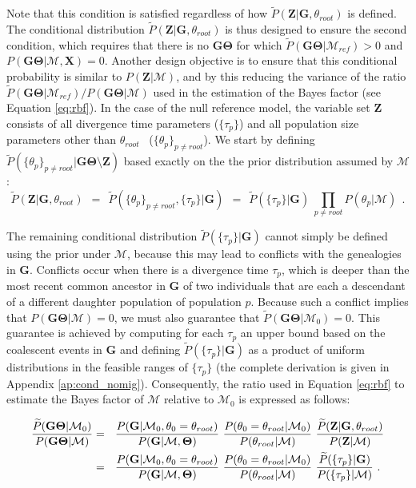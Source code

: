 \documentclass[11pt]{article}
\newcommand{\vect}[1]{\boldsymbol{\mathbf{#1}}}
\newcommand{\X}{\vect{X}}
\newcommand{\M}{\mathcal{M}}
\newcommand{\G}{\vect{G}}
\newcommand{\T}{\vect{\Theta}}
\newcommand{\GT}{\G\T}
\newcommand{\Mref}{\M_{ref}}
\newcommand{\Pref}{\widetilde{P}}
\newcommand{\Z}{\vect{Z}}
\newcommand{\troot}{\theta_{root}}
\begin{document}
%
Note that this condition is satisfied regardless of how $\Pref(\Z|\G,\troot)$ is defined.
%
The conditional distribution $\Pref(\Z|\G,\troot)$ is thus designed to ensure the second condition,
which requires that there is no $\GT$ for which $\Pref(\GT|\Mref)>0$ and $P(\GT|\M,\X)=0$.
%
Another design objective is to ensure that this conditional probability is similar to $P(\Z|\M)$,
and by this reducing the variance of the ratio
$\Pref(\GT|\Mref) / P(\GT|\M)$ used in the estimation of the Bayes factor (see Equation \ref{eq:rbf}).
%
In the case of the null reference model, the variable set $\Z$ consists of all divergence time parameters ($\{\tau_p\}$)
and all population size parameters other than $\troot$ ~($\{\theta_p\}_{p\neq root}$).
%
We start by defining $\Pref(\{\theta_p\}_{p\neq root}|\GT\setminus\Z)$ based exactly on the the prior distribution
assumed by $\M$:
%
%
\begin{equation}
 \Pref(\Z|\G,\troot) ~~=~~ \Pref(\{\theta_p\}_{p\neq root},\{\tau_p\}|\G) ~~=~~ 
 \Pref(\{\tau_p\}|\G) \ \prod_{p\neq root} P(\theta_p|\M)\  ~.\label{eq:cond_tau}
\end{equation}


The remaining conditional distribution $\Pref(\{\tau_p\}|\G)$ cannot simply be defined using the
prior under $\M$, because this may lead to conflicts with the genealogies in $\G$.
%
Conflicts occur when there is a divergence time $\tau_p$, which is deeper than the most recent common ancestor
in $\G$ of two individuals that are each a descendant of a different daughter population of population $p$.
%
Because such a conflict implies that $P(\GT|\M) = 0$, we must also guarantee that $\Pref(\GT|\M_0)=0$.
%
This guarantee is achieved by computing for each $\tau_p$ an upper bound based on the coalescent events in $\G$
and defining $\Pref(\{\tau_p\}|\G)$ as a product of uniform distributions in the feasible ranges of $\{\tau_p\}$
%
(the complete derivation is given in Appendix \ref{ap:cond_nomig}).
%
Consequently, the ratio used in Equation \ref{eq:rbf} to estimate the Bayes factor of $\M$ relative to $\M_0$ is expressed as follows:
%
%
\begin{small}
\begin{align}
\frac{\Pref(\GT|\M_0) }{P(\GT|\M)}
&=~~ \frac{ P(\G|\M_0,\theta_0=\troot) }{ P(\G|\M,\T)}~ 
     \frac{ P(\theta_0=\troot|\M_0)}{P(\troot|\M)}~
     \frac{ \Pref(\Z|\G,\troot)}{P(\Z|\M)} \notag \\
&=~~ \frac{ P(\G|\M_0,\theta_0=\troot) }{ P(\G|\M,\T)}~ 
     \frac{ P(\theta_0=\troot|\M_0)}{P(\troot|\M)}\
     \frac{ \Pref(\{\tau_p\}|\G)}{P(\{\tau_p\}|\M)} ~. \label{eq:rbf_null}
\end{align}
\end{small}
\end{document}
